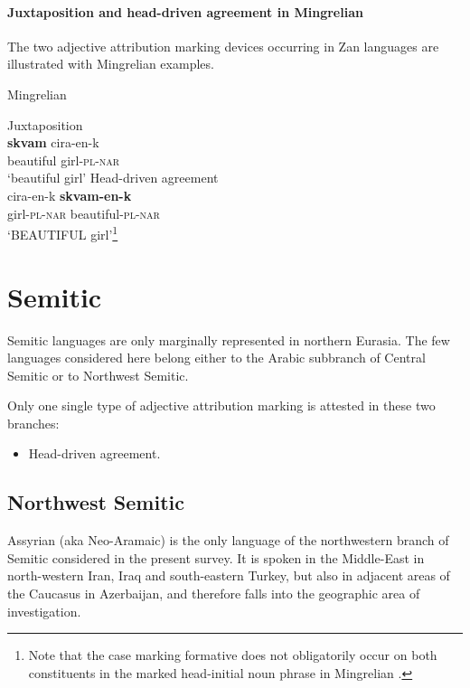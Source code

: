 \paragraph*{Juxtaposition and head\hyp{}driven agreement in Mingrelian}
The two adjective attribution marking devices occurring in Zan languages are illustrated with Mingrelian examples.
\begin{exe}
\ex \rm{Mingrelian \citep[361–364]{harris1991b}}
\begin{xlist}
\label{mingrelian juxt}
\ex \rm{Juxtaposition}\\
\gll	\textbf{skvam} cira-en-k\\
	beautiful girl-\textsc{pl}-\textsc{nar}\\
\glt	‘beautiful girl’%
\label{mingrelian agr}
\ex \rm{Head\hyp{}driven agreement}\\
\gll	cira-en-k \textbf{skvam-en-k}\\
	girl-\textsc{pl}-\textsc{nar} beautiful-\textsc{pl}-\textsc{nar}\\
\glt	‘BEAUTIFUL girl’\footnote{Note that the case marking formative does not obligatorily occur on both constituents in the marked head-initial noun phrase in Mingrelian \citep[363–364]{harris1991b}.}%
\end{xlist}
\end{exe}

\section{Semitic}
Semitic languages are only marginally represented in northern Eurasia. The few languages considered here belong either to the Arabic subbranch of Central Semitic or to Northwest Semitic.

Only one single type of adjective attribution marking is attested in these two branches:
\begin{itemize}
\item Head\hyp{}driven agreement.
\end{itemize}

\subsection{Northwest Semitic}
Assyrian (aka Neo-Aramaic) is the only language of the northwestern branch of Semitic considered in the present survey. It is spoken in the Middle-East in north-western Iran, Iraq and south-eastern Turkey, but also in adjacent areas of the Caucasus in Azerbaijan, and therefore falls into the geographic area of investigation.

